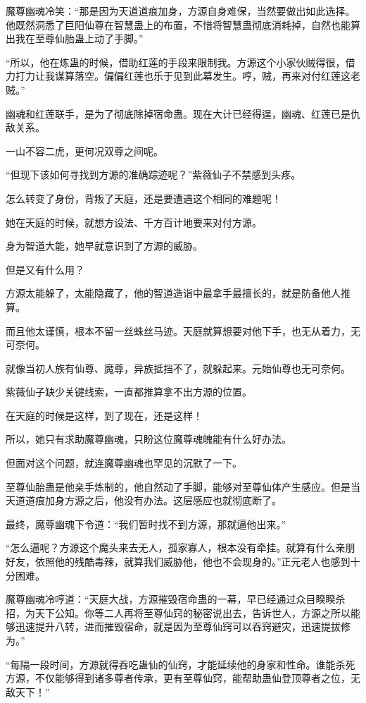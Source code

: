 \begin{this_body}
魔尊幽魂冷笑：“那是因为天道道痕加身，方源自身难保，当然要做出如此选择。他既然洞悉了巨阳仙尊在智慧蛊上的布置，不惜将智慧蛊彻底消耗掉，自然也能算出我在至尊仙胎蛊上动了手脚。”

“所以，他在炼蛊的时候，借助红莲的手段来限制我。方源这个小家伙贼得很，借力打力让我谋算落空。偏偏红莲也乐于见到此幕发生。哼，贼，再来对付红莲这老贼。”

幽魂和红莲联手，是为了彻底除掉宿命蛊。现在大计已经得逞，幽魂、红莲已是仇敌关系。

一山不容二虎，更何况双尊之间呢。

“但现下该如何寻找到方源的准确踪迹呢？”紫薇仙子不禁感到头疼。

怎么转变了身份，背叛了天庭，还是要遭遇这个相同的难题呢！

她在天庭的时候，就想方设法、千方百计地要来对付方源。

身为智道大能，她早就意识到了方源的威胁。

但是又有什么用？

方源太能躲了，太能隐藏了，他的智道造诣中最拿手最擅长的，就是防备他人推算。

而且他太谨慎，根本不留一丝蛛丝马迹。天庭就算想要对他下手，也无从着力，无可奈何。

就像当初人族有仙尊、魔尊，异族抵挡不了，就躲起来。元始仙尊也无可奈何。

紫薇仙子缺少关键线索，一直都推算拿不出方源的位置。

在天庭的时候是这样，到了现在，还是这样！

所以，她只有求助魔尊幽魂，只盼这位魔尊魂魄能有什么好办法。

但面对这个问题，就连魔尊幽魂也罕见的沉默了一下。

至尊仙胎蛊是他亲手炼制的，他自然动了手脚，能够对至尊仙体产生感应。但是当天道道痕加身方源之后，他没有办法。这层感应也就彻底断了。

最终，魔尊幽魂下令道：“我们暂时找不到方源，那就逼他出来。”

“怎么逼呢？方源这个魔头来去无人，孤家寡人，根本没有牵挂。就算有什么亲朋好友，依照他的残酷毒辣，就算我们威胁他，他也不会现身的。”正元老人也感到十分困难。

魔尊幽魂冷哼道：“天庭大战，方源摧毁宿命蛊的一幕，早已经通过众目睽睽杀招，为天下公知。你等二人再将至尊仙窍的秘密说出去，告诉世人，方源之所以能够迅速提升八转，进而摧毁宿命，就是因为至尊仙窍可以吞窍避灾，迅速提拔修为。”

“每隔一段时间，方源就得吞吃蛊仙的仙窍，才能延续他的身家和性命。谁能杀死方源，不仅能够得到诸多尊者传承，更有至尊仙窍，能帮助蛊仙登顶尊者之位，无敌天下！”


\end{this_body}
